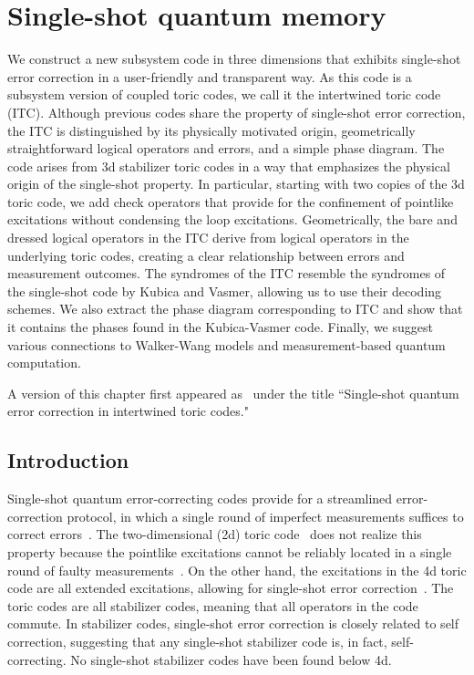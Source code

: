 
\chapter{Single-shot quantum memory}\label{chp:single-shot}

We construct a new subsystem code in three dimensions that exhibits single-shot error correction in a user-friendly and transparent way. As this code is a subsystem version of coupled toric codes, we call it the intertwined toric code (ITC). Although previous codes share the property of single-shot error correction, the ITC is distinguished by its physically motivated origin, geometrically straightforward logical operators and errors, and a simple phase diagram. The code arises from 3d stabilizer toric codes in a way that emphasizes the physical origin of the single-shot property. In particular, starting with two copies of the 3d toric code, we add check operators that provide for the confinement of pointlike excitations without condensing the loop excitations. Geometrically, the bare and dressed logical operators in the ITC derive from logical operators in the underlying toric codes, creating a clear relationship between errors and measurement outcomes. The syndromes of the ITC resemble the syndromes of the single-shot code by Kubica and Vasmer, allowing us to use their decoding schemes. We also extract the phase diagram corresponding to ITC and show that it contains the phases found in the Kubica-Vasmer code. Finally, we suggest various connections to Walker-Wang models and measurement-based quantum computation.

A version of this chapter first appeared as~\cite{Stahl2023Single} under the title ``Single-shot quantum error correction in intertwined toric codes."

\section{Introduction} \label{sec:intro}

Single-shot quantum error-correcting codes provide for a streamlined error-correction protocol, in which a single round of imperfect measurements suffices to correct errors~\cite{Bombin2015SingleShot}. The two-dimensional (2d) toric code~\cite{Kitaev2003Fault} does not realize this property because the pointlike excitations cannot be reliably located in a single round of faulty measurements~\cite{Dennis2002Topological}. On the other hand, the excitations in the 4d toric code are all extended excitations, allowing for single-shot error correction~\cite{Dennis2002Topological}. The toric codes are all stabilizer codes, meaning that all operators in the code commute. In stabilizer codes, single-shot error correction is closely related to self correction, suggesting that any single-shot stabilizer code is, in fact, self-correcting. No single-shot stabilizer codes have been found below 4d.

